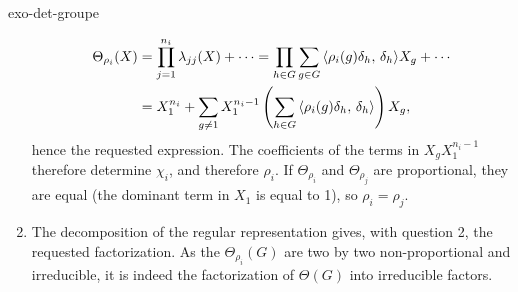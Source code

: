 \begin{correction}{exo-det-groupe}
\begin{enumerate}
\begin{align*}
\Theta_{\rho_i} (X) & = \prod_{j = 1}^{n_i}{\lambda_{jj} (X)} + \cdots = \prod_{h \in G}{\sum_{g \in G}{\langle \rho_i (g) \delta_h,\,\delta_h\rangle X_g}} + \cdots \\
& = X_1^{n_i} + \sum_{g \neq 1}{X_1^{n_i-1} \left(\sum_{h \in G}{\langle \rho_i (g) \delta_h,\,\delta_h\rangle} \right) X_g},
\end{align*}
hence the requested expression. The coefficients of the terms in $ X_g X_1^{n_i-1} $ therefore determine $ \chi_i $, and therefore $ \rho_i $. If $ \Theta_{\rho_i} $ and $ \Theta_{\rho_j} $ are proportional, they are equal (the dominant term in $ X_1 $ is equal to 1), so $ \rho_i = \rho_j $.
\item The decomposition of the regular representation gives, with question 2, the requested factorization. As the $ \Theta_{\rho_i} (G) $ are two by two non-proportional and irreducible, it is indeed the factorization of $ \Theta (G) $ into irreducible factors.
\end{enumerate}
\end{correction}
 
